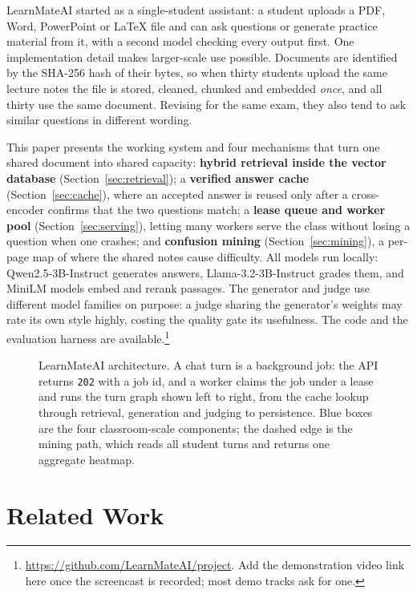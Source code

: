 \documentclass[conference]{IEEEtran}
\newcommand{\sys}{LearnMateAI}
\begin{document}
\sys{} started as a single-student assistant: a student uploads a PDF, Word, PowerPoint or \LaTeX{} file
and can ask questions or generate practice material from it, with a second model checking every output
first. One implementation detail makes larger-scale use possible. Documents are identified by the
SHA-256 hash of their bytes, so when thirty students upload the same lecture notes the file is stored,
cleaned, chunked and embedded \emph{once}, and all thirty use the same document. Revising for the same
exam, they also tend to ask similar questions in different wording.

This paper presents the working system and four mechanisms that turn one shared document into shared
capacity: \textbf{hybrid retrieval inside the vector database} (Section~\ref{sec:retrieval}); a
\textbf{verified answer cache} (Section~\ref{sec:cache}), where an accepted answer is reused only after a
cross-encoder confirms that the two questions match; a \textbf{lease queue and worker pool}
(Section~\ref{sec:serving}), letting many workers serve the class without losing a question when one
crashes; and \textbf{confusion mining} (Section~\ref{sec:mining}), a per-page map of where the shared notes
cause difficulty. All models run locally: Qwen2.5-3B-Instruct generates answers, Llama-3.2-3B-Instruct grades
them, and MiniLM models embed and rerank passages. The generator and judge use different model families on
purpose: a judge sharing the generator's weights may rate its own style highly, costing the quality gate its
usefulness. The code and the evaluation harness are
available.\footnote{\url{https://github.com/LearnMateAI/project}. Add the demonstration video link
here once the screencast is recorded; most demo tracks ask for one.}

\begin{figure}[t]
\centering

\caption{\sys{} architecture. A chat turn is a background job: the API returns \texttt{202} with a job id, and a
worker claims the job under a lease and runs the turn graph shown left to right, from the cache lookup through
retrieval, generation and judging to persistence. Blue boxes are the four classroom-scale components; the dashed
edge is the mining path, which reads all student turns and returns one aggregate heatmap.}
\label{fig:arch}
\end{figure}

\section{Related Work}
\end{document}
